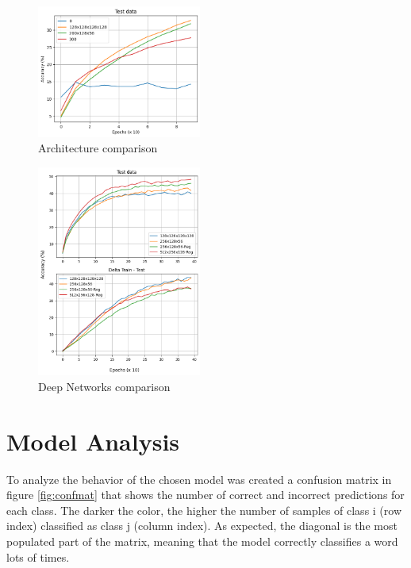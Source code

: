 \documentclass{article}
\begin{document}
\begin{multicols}{2}
    \begin{figure}[H]
        \centering
        \includegraphics[width=0.48\textwidth]{arch_comp_test.png}
        \caption{\small Architecture comparison}
        \label{fig:acte}
    \end{figure}

    \begin{figure}[H]
        \centering
        \includegraphics[width=0.48\textwidth]{chosen_comp_test_delta.png}
        \caption{\small Deep Networks comparison}
        \label{fig:chosencomp}
    \end{figure}



\section{Model Analysis}
To analyze the behavior of the chosen model was created a confusion matrix in figure \ref{fig:confmat} that shows the number of correct and 
incorrect predictions for each class. The darker the color, the higher the number of samples of class i (row index) classified as class j (column index). As expected, the diagonal
is the most populated part of the matrix, meaning that the model correctly classifies a word lots of times. 


\end{multicols}
\end{document}
